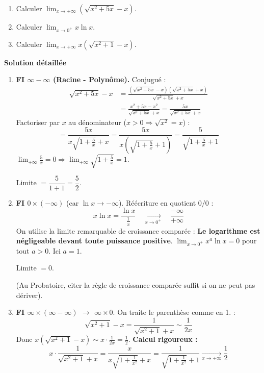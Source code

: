 \documentclass[11pt]{article}
\begin{document}
\begin{exoresolu}
    \begin{enumerate}
        \item Calculer $\lim_{x\to +\infty} \left( \sqrt{x^2 + 5x} - x \right)$.
        \item Calculer $\lim_{x\to 0^+} x \ln x$.
        \item Calculer $\lim_{x\to +\infty} x \left( \sqrt{x^2+1} - x \right)$.
    \end{enumerate}
    \tcblower
    \textbf{Solution détaillée}
    \begin{enumerate}
        \item \textbf{FI $\infty - \infty$ (Racine - Polynôme).} Conjugué :
              \begin{align*}
                  \sqrt{x^2+5x} - x &= \frac{(\sqrt{x^2+5x} - x)(\sqrt{x^2+5x} + x)}{\sqrt{x^2+5x} + x} \\
                  &= \frac{x^2+5x - x^2}{\sqrt{x^2+5x} + x} = \frac{5x}{\sqrt{x^2+5x} + x}
              \end{align*}
              Factoriser par $x$ au dénominateur ($x>0 \Rightarrow \sqrt{x^2}=x$) :
              \[ = \frac{5x}{x\sqrt{1+\frac{5}{x}} + x} = \frac{5x}{x(\sqrt{1+\frac{5}{x}} + 1)} = \frac{5}{\sqrt{1+\frac{5}{x}} + 1} \]
              $\lim_{+\infty} \frac{5}{x} = 0 \Rightarrow \lim_{+\infty} \sqrt{1+\frac{5}{x}} = 1$.
              \begin{aretenir}
                  Limite $= \dfrac{5}{1+1} = \dfrac{5}{2}$.
              \end{aretenir}
        \item \textbf{FI $0 \times (-\infty)$} (car $\ln x \to -\infty$). Réécriture en quotient $0/0$ :
              \[ x \ln x = \frac{\ln x}{\frac{1}{x}} \quad \xrightarrow[x\to 0^+]{} \quad \frac{-\infty}{+\infty} \]
              On utilise la limite remarquable de croissance comparée : \textbf{Le logarithme est négligeable devant toute puissance positive}.
              $\lim_{x\to 0^+} x^a \ln x = 0$ pour tout $a>0$. Ici $a=1$.
              \begin{aretenir}
                  Limite $= 0$.
              \end{aretenir}
              (Au Probatoire, citer la règle de croissance comparée suffit si on ne peut pas dériver).
        \item \textbf{FI $\infty \times (\infty - \infty)$ $\to$ $\infty \times 0$}. On traite le parenthèse comme en 1. :
              \[ \sqrt{x^2+1} - x = \frac{1}{\sqrt{x^2+1} + x} \sim \frac{1}{2x} \]
              Donc $x \left( \sqrt{x^2+1} - x \right) \sim x \cdot \frac{1}{2x} = \frac{1}{2}$.
              \textbf{Calcul rigoureux :}
              \[ x \cdot \frac{1}{\sqrt{x^2+1} + x} = \frac{x}{x\sqrt{1+\frac{1}{x^2}} + x} = \frac{1}{\sqrt{1+\frac{1}{x^2}} + 1} \xrightarrow[x\to+\infty]{} \frac{1}{2} \]
    \end{enumerate}
\end{exoresolu}
\end{document}

